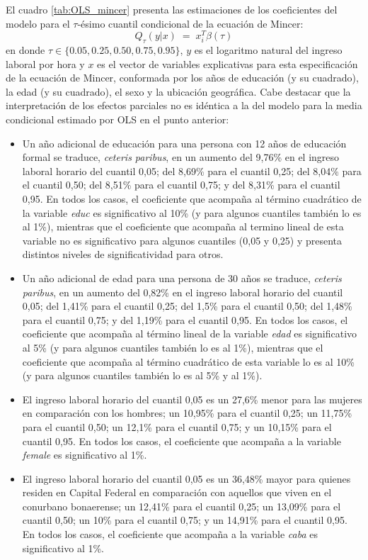 \documentclass[11pt]{article}
\begin{document}
El cuadro \ref{tab:OLS_mincer} presenta las estimaciones de los coeficientes del modelo para el $\tau$-ésimo cuantil condicional de la ecuación de Mincer:
\[
Q_{\tau}(y|x)\;=\;x_{i}^{T}\beta(\tau)
\]
en donde $\tau\in\{0.05,0.25,0.50,0.75,0.95\}$, $y$ es el logaritmo natural del ingreso laboral por hora y $x$ es el vector de variables explicativas para esta especificación de la ecuación de Mincer, conformada por los años de educación (y su cuadrado), la edad (y su cuadrado), el sexo y la ubicación geográfica. Cabe destacar que la interpretación de los efectos parciales no es idéntica a la del modelo para la media condicional estimado por OLS en el punto anterior:
    \begin{itemize}
        \item Un año adicional de educación para una persona con 12 años de educación formal se traduce, \emph{ceteris paribus}, en un aumento del 9,76\% en el ingreso laboral horario del cuantil 0,05; del 8,69\% para el cuantil 0,25; del 8,04\% para el cuantil 0,50; del 8,51\% para el cuantil 0,75; y del 8,31\% para el cuantil 0,95. En todos los casos, el coeficiente que acompaña al término cuadrático de la variable \emph{educ} es significativo al 10\% (y para algunos cuantiles también lo es al 1\%), mientras que el coeficiente que acompaña al termino lineal de esta variable no es significativo para algunos cuantiles (0,05 y 0,25) y presenta distintos niveles de significatividad para otros.
        \item Un año adicional de edad para una persona de 30 años se traduce, \emph{ceteris paribus}, en un aumento del 0,82\% en el ingreso laboral horario del cuantil 0,05; del 1,41\% para el cuantil 0,25; del 1,5\% para el cuantil 0,50; del 1,48\% para el cuantil 0,75; y del 1,19\% para el cuantil 0,95. En todos los casos, el coeficiente que acompaña al término lineal de la variable \emph{edad} es significativo al 5\% (y para algunos cuantiles también lo es al 1\%), mientras que el coeficiente que acompaña al término cuadrático de esta variable lo es al 10\% (y para algunos cuantiles también lo es al 5\% y al 1\%). 
        \item El ingreso laboral horario del cuantil 0,05 es un 27,6\% menor para las mujeres en comparación con los hombres; un 10,95\% para el cuantil 0,25; un 11,75\% para el cuantil 0,50; un 12,1\% para el cuantil 0,75; y un 10,15\% para el cuantil 0,95. En todos los casos, el coeficiente que acompaña a la variable \emph{female} es significativo al 1\%.
        \item El ingreso laboral horario del cuantil 0,05 es un 36,48\% mayor para quienes residen en Capital Federal en comparación con aquellos que viven en el conurbano bonaerense; un 12,41\% para el cuantil 0,25; un 13,09\% para el cuantil 0,50; un 10\% para el cuantil 0,75; y un 14,91\% para el cuantil 0,95. En todos los casos, el coeficiente que acompaña a la variable \emph{caba} es significativo al 1\%.
    \end{itemize}
\end{document}
